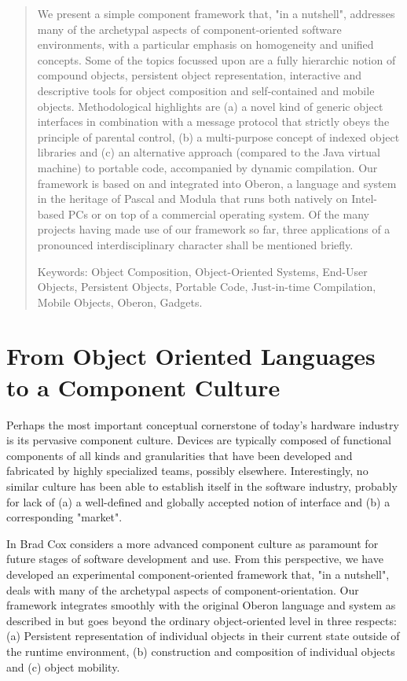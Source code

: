 \begin{abstract}            %
We present a simple component framework that, "in a nutshell",
addresses many of the archetypal aspects of component-oriented
software environments, with a particular emphasis on homogeneity
and unified concepts.
Some of the topics focussed upon are a fully hierarchic notion
of compound objects, persistent object representation, interactive and
descriptive tools for object composition and self-contained and mobile
objects. Methodological highlights are (a) a novel kind of generic object
interfaces in combination with a message protocol that strictly obeys
the principle of parental control, (b) a multi-purpose concept of indexed
object libraries and (c) an alternative approach (compared to the Java
virtual machine) to portable code, accompanied by dynamic compilation.
Our framework is based on and integrated into Oberon, a language
and system in the heritage of Pascal and Modula that runs both natively
on Intel-based PCs or on top of a commercial operating system. Of the
many projects having made use of our framework so far, three applications
of a pronounced interdisciplinary character shall be mentioned briefly.

\medskip
\noindent
Keywords: Object Composition, Object-Oriented Systems, End-User Objects,
Persistent Objects, Portable Code, Just-in-time Compilation, Mobile Objects,
Oberon, Gadgets.
\end{abstract}

\section{From Object Oriented Languages to a Component Culture}

Perhaps the most important conceptual cornerstone of today's hardware
industry is its pervasive component culture. Devices are typically
composed of functional components of all kinds and granularities that have
been developed and fabricated by highly specialized teams, possibly elsewhere.
Interestingly, no similar culture has been able to establish itself in the
software industry, probably for lack of (a) a well-defined and globally
accepted notion of interface and (b) a corresponding "market".

\ein
In \cite{1} Brad Cox considers a more advanced component culture as
paramount for future stages of software development and use. From this
perspective, we have developed an experimental component-oriented
framework that, "in a nutshell", deals with many of the archetypal aspects
of component-orientation.
Our framework integrates smoothly with the original Oberon language
and system as described in \cite{2, 3, 4} but goes beyond the ordinary
object-oriented level in three respects: (a) Persistent representation
of individual objects in their current state outside of the runtime
environment, (b) construction and composition of individual objects
and (c) object mobility.

